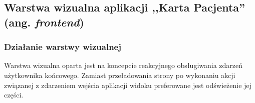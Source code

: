 \subsection{Warstwa wizualna aplikacji ,,Karta Pacjenta'' (ang. \textit{frontend})}
\subsubsection{Działanie warstwy wizualnej}
Warstwa wizualna oparta jest na koncepcie reakcyjnego obsługiwania zdarzeń użytkownika końcowego. Zamiast przeładowania strony po wykonaniu akcji związanej z zdarzeniem wejścia aplikacji widoku preferowane jest odświeżenie jej części.



